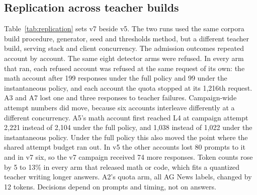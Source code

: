 \documentclass[journal]{IEEEtran}
\begin{document}
\subsection{Replication across teacher builds}
Table~\ref{tab:replication} sets v7 beside v5. The two runs used the same corpora build procedure, generator, seed and thresholds method, but a different teacher build, serving stack and client concurrency. The admission outcomes repeated account by account. The same eight detector arms were refused. In every arm that ran, each refused account was refused at the same request of its own: the math account after 199 responses under the full policy and 99 under the instantaneous policy, and each account the quota stopped at its 1,216th request. A3 and A7 lost one and three responses to teacher failures. Campaign-wide attempt numbers did move, because six accounts interleave differently at a different concurrency. A5's math account first reached L4 at campaign attempt 2,221 instead of 2,104 under the full policy, and 1,038 instead of 1,022 under the instantaneous policy. Under the full policy this also moved the point where the shared attempt budget ran out. In v5 the other accounts lost 80 prompts to it and in v7 six, so the v7 campaign received 74 more responses. Token counts rose by 5 to 13\% in every arm that released math or code, which fits a quantized teacher writing longer answers. A2's quota arm, all AG News labels, changed by 12 tokens. Decisions depend on prompts and timing, not on answers.
\end{document}
